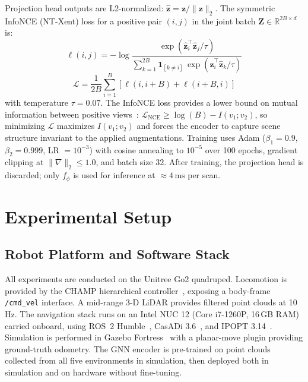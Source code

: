 \documentclass[conference]{IEEEtran}
\begin{document}
Projection head outputs are L2-normalized: $\hat{\mathbf{z}} = \mathbf{z}/\|\mathbf{z}\|_2$. The symmetric InfoNCE (NT-Xent) loss for a positive pair $(i, j)$ in the joint batch $\mathbf{Z} \in \mathbb{R}^{2B \times d}$ is:
\begin{equation}
	\ell(i, j) = -\log \frac{\exp(\hat{\mathbf{z}}_i^\top \hat{\mathbf{z}}_j / \tau)}{\sum_{k=1}^{2B} \mathbf{1}_{[k \neq i]}\, \exp(\hat{\mathbf{z}}_i^\top \hat{\mathbf{z}}_k / \tau)}
	\label{eq:infonce}
\end{equation}
\begin{equation}
	\mathcal{L} = \frac{1}{2B}\sum_{i=1}^{B}\!\left[\ell(i, i{+}B) + \ell(i{+}B, i)\right]
	\label{eq:ntxent}
\end{equation}
with temperature $\tau = 0.07$. The InfoNCE loss provides a lower bound on mutual information between positive views~\cite{@TODO}: $\mathcal{L}_{\text{NCE}} \geq \log(B) - I(v_1; v_2)$, so minimizing $\mathcal{L}$ maximizes $I(v_1; v_2)$ and forces the encoder to capture scene structure invariant to the applied augmentations. Training uses Adam ($\beta_1 = 0.9$, $\beta_2 = 0.999$, LR $= 10^{-3}$) with cosine annealing to $10^{-5}$ over 100 epochs, gradient clipping at $\|\nabla\|_2 \le 1.0$, and batch size 32. After training, the projection head is discarded; only $f_\phi$ is used for inference at $\approx 4\,\text{ms}$ per scan.

\section{Experimental Setup}
\label{sec:experiments}

\subsection{Robot Platform and Software Stack}

All experiments are conducted on the Unitree Go2 quadruped. Locomotion is provided by the CHAMP hierarchical controller~\cite{articleHierarchicalController}, exposing a body-frame \texttt{/cmd\_vel} interface. A mid-range 3-D LiDAR provides filtered point clouds at 10\,Hz. The navigation stack runs on an Intel NUC 12 (Core i7-1260P, 16\,GB RAM) carried onboard, using ROS~2 Humble~\cite{@TODO}, CasADi 3.6~\cite{@TODO}, and IPOPT 3.14~\cite{@TODO}. Simulation is performed in Gazebo Fortress~\cite{@TODO} with a planar-move plugin providing ground-truth odometry. The GNN encoder is pre-trained on point clouds collected from all five environments in simulation, then deployed both in simulation and on hardware without fine-tuning.
\end{document}
